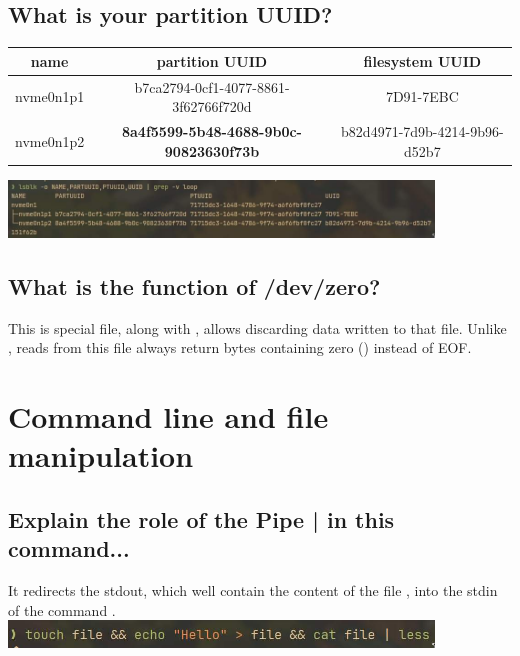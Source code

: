 \documentclass{article}
\begin{document}
\subsection{What is your partition UUID?}
\noindent

\begin{table}[H]
	\centering
	\begin{tabular}{|c|c|c|}
		\toprule
		name      & partition UUID                                & filesystem UUID               \\ \midrule
		nvme0n1p1 & b7ca2794-0cf1-4077-8861-3f62766f720d          & 7D91-7EBC                     \\
		nvme0n1p2 & \textbf{8a4f5599-5b48-4688-9b0c-90823630f73b} & b82d4971-7d9b-4214-9b96-d52b7 \\
		\bottomrule
	\end{tabular}
\end{table}

\includegraphics[width=320pt]{uuid.jpg}

\subsection{What is the function of /dev/zero?}
\noindent

This is special file, along with , allows discarding data written to that file.
Unlike , reads from this file always return bytes containing zero (\codeword{\0}) instead of EOF.

\section{Command line and file manipulation}

\subsection{Explain the role of the Pipe | in this command...}
\noindent

It redirects the stdout, which well contain the content of the file , into the stdin of the command
. \\

\includegraphics[width=320pt]{pipe.jpg}
\end{document}
